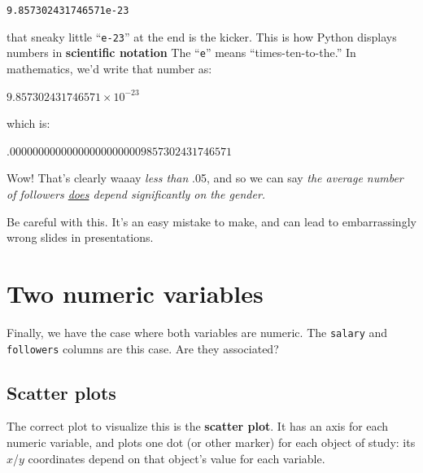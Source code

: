 \vspace{-.1in}
\begin{center}
\texttt{9.857302431746571e-23}
\end{center}
\vspace{-.1in}


that sneaky little ``\texttt{e-23}'' at the end is the kicker. This is how
Python displays numbers in \textbf{scientific notation} The
``\texttt{e}'' means ``times-ten-to-the.'' In mathematics, we'd write that
number as:

\vspace{-.2in}
\begin{center}
$9.857302431746571 \times 10^{-23}$
\end{center}
\vspace{-.2in}

which is:

\vspace{-.2in}
\begin{center}
$.000000000000000000000009857302431746571$
\end{center}
\vspace{-.2in}

Wow! That's clearly waaay \textit{less than} .05, and so we can say \textit{the
average number of followers \underline{does} depend significantly on the gender.}

Be careful with this. It's an easy mistake to make, and can lead to
embarrassingly wrong slides in presentations. \smiley


\section{Two numeric variables}

Finally, we have the case where both variables are numeric. The \texttt{salary}
and \texttt{followers} columns are this case. Are they associated?

\subsection{Scatter plots}

The correct plot to visualize this is the \textbf{scatter plot}. It has an
axis for each numeric variable, and plots one dot (or other marker) for each
object of study: its $x$/$y$ coordinates depend on that object's value for each
variable.

